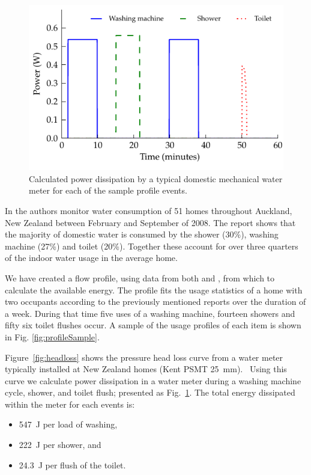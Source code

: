 \documentclass[10pt,final,journal]{IEEEtran}
\begin{document}
    \begin{figure}
        \begin{center}
        \includegraphics[width=\linewidth]{graph_harvest}
        \end{center}
        \caption{Calculated power dissipation by a typical domestic mechanical water meter for each of the sample profile events.}
        \label{fig:powerDissipated_meter}
    \end{figure}


    In \cite{Heinrich2008} the authors monitor water consumption of 51 homes throughout Auckland, New Zealand between February and September of 2008.
    The report shows that the majority of domestic water is consumed by the shower (30\%), washing machine (27\%) and toilet (20\%).
    Together these account for over three quarters of the indoor water usage in the average home.

    We have created a flow profile, using data from both \cite{Heinrich2008} and \cite{Heinrich2007}, from which to calculate the available energy.
    The profile fits the usage statistics of a home with two occupants according to the previously mentioned reports over the duration of a week.
    During that time five uses of a washing machine, fourteen showers and fifty six toilet flushes occur.
    A sample of the usage profiles of each item is shown in Fig. \ref{fig:profileSample}.

    Figure~\ref{fig:headloss} shows the pressure head loss curve from a water meter typically installed at New Zealand homes (Kent PSMT \SI{25}{\milli\meter}).~\cite{WatercareNewZealand2014}
    Using this curve we calculate power dissipation in a water meter during a washing machine cycle, shower, and toilet flush; presented as Fig.~\ref{fig:powerDissipated_meter}.
    The total energy dissipated within the meter for each events is:
    \begin{itemize}
    \item \SI{547}{\joule} per load of washing,
    \item \SI{222}{\joule} per shower, and
    \item \SI{24.3}{\joule} per flush of the toilet.
    \end{itemize}
\end{document}
